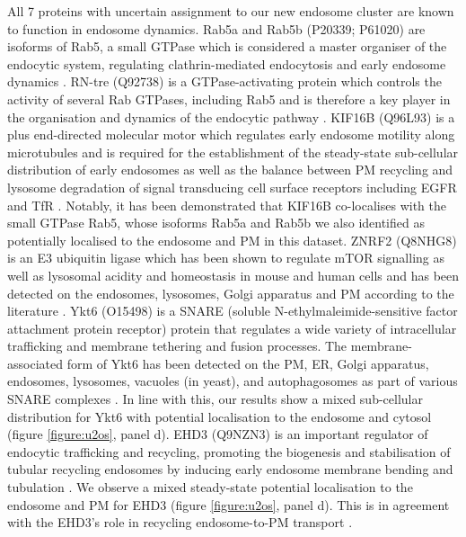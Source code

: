 \documentclass[12pt,english]{article}
\begin{document}
All 7 proteins with uncertain assignment to our new endosome cluster are known to function in endosome dynamics. Rab5a and Rab5b (P20339; P61020) are isoforms of Rab5, a small GTPase which is considered a master organiser of the endocytic system, regulating clathrin-mediated endocytosis and early endosome dynamics \citep{Simonsen::1998,Woodman::2000, Zerial::2001, Rink::2005, Mendoza::2013, Chen::2014, Gautreau::2014, Law::2017}. RN-tre (Q92738) is a GTPase-activating protein which controls the activity of several Rab GTPases, including Rab5 and is therefore a key player in the organisation and dynamics of the endocytic pathway \citep{Lanzetti::2000, Gautreau::2014}. KIF16B (Q96L93) is a plus end-directed molecular motor which regulates early endosome motility along microtubules and is required for the establishment of the steady-state sub-cellular distribution of early endosomes as well as the balance between PM recycling and lysosome degradation of signal transducing cell surface receptors including EGFR and TfR \citep{Hoepfner:2005, Carlucci::2010}. Notably, it has been demonstrated that KIF16B co-localises with the small GTPase Rab5, whose isoforms Rab5a and Rab5b we also identified as potentially localised to the endosome and PM in this dataset. ZNRF2 (Q8NHG8) is an E3 ubiquitin ligase which has been shown to regulate mTOR signalling as well as lysosomal acidity and homeostasis in mouse and human cells and has been detected on the endosomes, lysosomes, Golgi apparatus and PM according to the literature \citep{Araki:2003, Hoxhaj:2016}. Ykt6 (O15498) is a SNARE (soluble N-ethylmaleimide-sensitive factor attachment protein receptor) protein that regulates a wide variety of intracellular trafficking and membrane tethering and fusion processes. The membrane-associated form of Ykt6 has been detected on the PM, ER, Golgi apparatus, endosomes, lysosomes, vacuoles (in yeast), and autophagosomes as part of various SNARE complexes \citep{Dilcher::2001, Tai:2004,Fukasawa::2004,Meiringer::2008, Takats::2018, Matsui::2018, Linnemannstons::2018, Yong::2019}. In line with this, our results show a mixed sub-cellular distribution for Ykt6 with potential localisation to the endosome and cytosol (figure \ref{figure:u2os}, panel d). EHD3 (Q9NZN3) is an important regulator of endocytic trafficking and recycling, promoting the biogenesis and stabilisation of tubular recycling endosomes by inducing early endosome membrane bending and tubulation \citep{Bahl::2016,Henmi::2016}. We observe a mixed steady-state potential localisation to the endosome and PM for EHD3 (figure \ref{figure:u2os}, panel d). This is in agreement with the EHD3's role in recycling endosome-to-PM transport \citep{Naslavsky::2006,Naslavsky::2009,George::2007,Cabasso::2015, Henmi::2016}.
\end{document}
